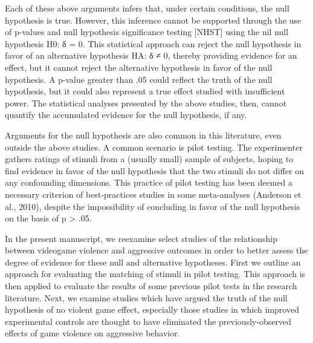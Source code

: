 \documentclass{article}
\begin{document}
Each of these above arguments infers that, under certain conditions, the null hypothesis is true. However, this inference cannot be supported through the use of p-values and null hypothesis significance testing [NHST] using the nil null hypothesis H0: δ = 0.  This statistical approach can reject the null hypothesis in favor of an alternative hypothesis HA: δ ≠ 0, thereby providing evidence for an effect, but it cannot reject the alternative hypothesis in favor of the null hypothesis. A p-value greater than .05 could reflect the truth of the null hypothesis, but it could also represent a true effect studied with insufficient power. The statistical analyses presented by the above studies, then, cannot quantify the accumulated evidence for the null hypothesis, if any.

Arguments for the null hypothesis are also common in this literature, even outside the above studies. A common scenario is pilot testing. The experimenter gathers ratings of stimuli from a (usually small) sample of subjects, hoping to find evidence in favor of the null hypothesis that the two stimuli do not differ on any confounding dimensions. This practice of pilot testing has been deemed a necessary criterion of best-practices studies in some meta-analyses (Anderson et al., 2010), despite the impossibility of concluding in favor of the null hypothesis on the basis of p > .05.

In the present manuscript, we reexamine select studies of the relationship between videogame violence and aggressive outcomes in order to better assess the degree of evidence for these null and alternative hypotheses. First we outline an approach for evaluating the matching of stimuli in pilot testing. This approach is then applied to evaluate the results of some previous pilot tests in the research literature. Next, we examine studies which have argued the truth of the null hypothesis of no violent game effect, especially those studies in which improved experimental controls are thought to have eliminated the previously-observed effects of game violence on aggressive behavior. 
\end{document}
